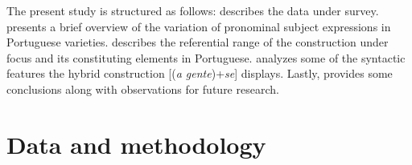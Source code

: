 \documentclass[output=paper]{langscibook}
\begin{document}
The present study is structured as follows:  describes the data under survey.  presents a brief overview of the variation of  pronominal subject expressions in Portuguese varieties.  describes the referential range of the construction under focus and its constituting elements in Portuguese.  analyzes some of the syntactic features the hybrid construction [(\textit{a gente})+\textit{se}] displays. Lastly,  provides some conclusions along with observations for future research.

\section{Data and methodology}\label{sec:henriques:2}
\end{document}
